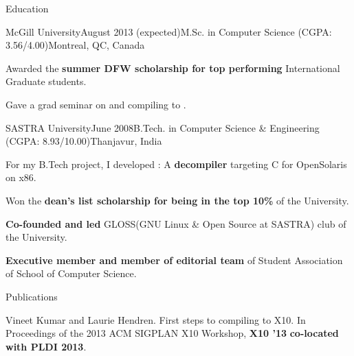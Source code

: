 \documentclass{resume} %
\begin{document}
 \begin{rSection}{Education}

\begin{rSubsection}{McGill University}{August 2013 (expected)}{M.Sc. in Computer Science (CGPA: 3.56/4.00)}{Montreal, QC, Canada}
\item Awarded the  \textbf{summer DFW scholarship for top performing} International Graduate students.
\item Gave a grad seminar on \xten and compiling \matlab to \xten.
\end{rSubsection}
\begin{rSubsection}{SASTRA University}{June 2008}{B.Tech. in Computer Science \& Engineering (CGPA: 8.93/10.00)}{Thanjavur, India}
\item For my B.Tech project, I developed \discode: A \textbf{decompiler} targeting C for OpenSolaris on x86.
\item Won the  \textbf{dean's list scholarship for being in the top 10\% }of the University. 
\item \textbf{Co-founded and led} GLOSS(GNU Linux \& Open Source at SASTRA) club of the University.
\item \textbf{Executive member and member of editorial team} of Student Association of School of Computer Science. 
\end{rSubsection}

\end{rSection}


\begin{rSection}{Publications}
\begin{lSubsection}
\smallskip
\item Vineet Kumar and Laurie Hendren. First steps to compiling \matlab to \textsc{X10}.
In Proceedings of the 2013 ACM SIGPLAN X10 Workshop, \textbf{X10 '13} \textbf{co-located with PLDI 2013}.
\end{lSubsection}
\end{rSection}
\end{document}
